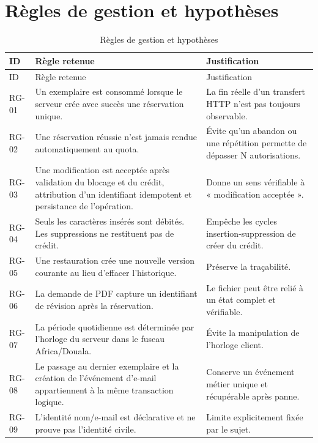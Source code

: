 \section{Règles de gestion et hypothèses}
\begingroup\small\setlength{\tabcolsep}{3pt}\renewcommand{\arraystretch}{1.25}
\begin{longtable}{|P{.12\textwidth}|P{.43\textwidth}|P{.38\textwidth}|}
\caption{Règles de gestion et hypothèses}\\
\hline
ID & Règle retenue & Justification \\ \hline
\endfirsthead
\hline
ID & Règle retenue & Justification \\ \hline
\endhead
\endfoot

RG-01 & Un exemplaire est consommé lorsque le serveur crée avec succès une réservation unique. & La fin réelle d'un transfert HTTP n'est pas toujours observable. \\ \hline

RG-02 & Une réservation réussie n'est jamais rendue automatiquement au quota. & Évite qu'un abandon ou une répétition permette de dépasser N autorisations. \\ \hline

RG-03 & Une modification est acceptée après validation du blocage et du crédit, attribution d'un identifiant idempotent et persistance de l'opération. & Donne un sens vérifiable à « modification acceptée ». \\ \hline

RG-04 & Seuls les caractères insérés sont débités. Les suppressions ne restituent pas de crédit. & Empêche les cycles insertion-suppression de créer du crédit. \\ \hline

RG-05 & Une restauration crée une nouvelle version courante au lieu d'effacer l'historique. & Préserve la traçabilité. \\ \hline

RG-06 & La demande de PDF capture un identifiant de révision après la réservation. & Le fichier peut être relié à un état complet et vérifiable. \\ \hline

RG-07 & La période quotidienne est déterminée par l'horloge du serveur dans le fuseau Africa/Douala. & Évite la manipulation de l'horloge client. \\ \hline

RG-08 & Le passage au dernier exemplaire et la création de l'événement d'e-mail appartiennent à la même transaction logique. & Conserve un événement métier unique et récupérable après panne. \\ \hline

RG-09 & L'identité nom/e-mail est déclarative et ne prouve pas l'identité civile. & Limite explicitement fixée par le sujet. \\ \hline

\end{longtable}\endgroup

